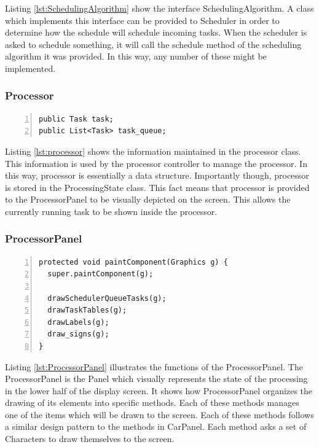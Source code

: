 \documentclass{article} %
\begin{document}
Listing \ref{lst:SchedulingAlgorithm} show the interface SchedulingAlgorithm.
A class which implements this interface can be provided to Scheduler in order to determine how the schedule will schedule incoming tasks.
When the scheduler is asked to schedule something, it will call the schedule method of the scheduling algorithm it was provided.
In this way, any number of these might be implemented.

\subsubsection{Processor}
\begin{lstlisting}[caption={Values maintained in Processor},label={lst:processor},numbers=left]
public Task task;
public List<Task> task_queue;
\end{lstlisting}

Listing \ref{lst:processor} shows the information maintained in the processor class.
This information is used by the processor controller to manage the processor.
In this way, processor is essentially a data structure.
Importantly though, processor is stored in the ProcessingState class.
This fact means that processor is provided to the ProcessorPanel to be visually depicted on the screen.
This allows the currently running task to be shown inside the processor.

\subsubsection{ProcessorPanel}
\begin{lstlisting}[caption={Update process of ProcessorPanel},label={lst:ProcessorPanel},numbers=left]
protected void paintComponent(Graphics g) {
  super.paintComponent(g);

  drawSchedulerQueueTasks(g);
  drawTaskTables(g);
  drawLabels(g);
  draw_signs(g);
}
\end{lstlisting}

Listing \ref{lst:ProcessorPanel} illustrates the functions of the ProcessorPanel.
The ProcessorPanel is the Panel which visually represents the state of the processing in the lower half of the display screen.
It shows how ProcessorPanel organizes the drawing of its elements into specific methods.
Each of these methods manages one of the items which will be drawn to the screen.
Each of these methods follows a similar design pattern to the methods in CarPanel.
Each method asks a set of Characters to draw themselves to the screen.
\end{document}
